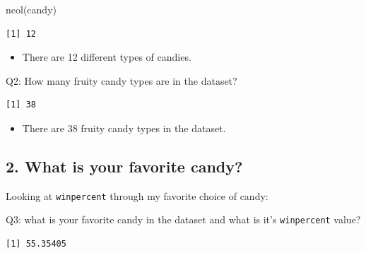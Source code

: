 \documentclass[
  letterpaper,
  DIV=11,
  numbers=noendperiod]{scrartcl}
\newenvironment{Shaded}{\begin{snugshade}}{\end{snugshade}}
\newcommand{\FunctionTok}[1]{\textcolor[rgb]{0.28,0.35,0.67}{#1}}
\newcommand{\NormalTok}[1]{\textcolor[rgb]{0.00,0.23,0.31}{#1}}
\newcommand{\SpecialCharTok}[1]{\textcolor[rgb]{0.37,0.37,0.37}{#1}}
\newcommand{\StringTok}[1]{\textcolor[rgb]{0.13,0.47,0.30}{#1}}
\providecommand{\tightlist}{%
  \setlength{\itemsep}{0pt}\setlength{\parskip}{0pt}}\usepackage{longtable,booktabs,array}
\begin{document}
\begin{Shaded}
\begin{Highlighting}[]
\FunctionTok{ncol}\NormalTok{(candy)}
\end{Highlighting}
\end{Shaded}

\begin{verbatim}
[1] 12
\end{verbatim}

\begin{itemize}
\tightlist
\item
  There are 12 different types of candies.
\end{itemize}

Q2: How many fruity candy types are in the dataset?

\begin{Shaded}
\end{Shaded}

\begin{verbatim}
[1] 38
\end{verbatim}

\begin{itemize}
\tightlist
\item
  There are 38 fruity candy types in the dataset.
\end{itemize}

\hypertarget{what-is-your-favorite-candy}{%
\subsection{2. What is your favorite
candy?}\label{what-is-your-favorite-candy}}

Looking at \texttt{winpercent} through my favorite choice of candy:

Q3: what is your favorite candy in the dataset and what is it's
\texttt{winpercent} value?

\begin{Shaded}
\end{Shaded}

\begin{verbatim}
[1] 55.35405
\end{verbatim}
\end{document}
